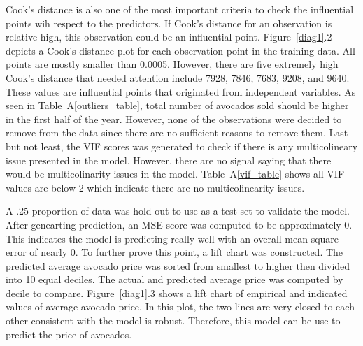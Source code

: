 \documentclass[11pt]{article}\usepackage[]{graphicx}\usepackage[]{color}
\begin{document}
\noindent Cook's distance is also one of the most important criteria to check the influential points wih respect to the predictors. If Cook's distance for an observation is relative high, this observation could be an influential point. Figure~\ref{diag1}.2 depicts a Cook's distance plot for each observation point in the training data. All points are mostly smaller than 0.0005. However, there are five extremely high Cook's distance that needed attention include 7928, 7846, 7683, 9208, and 9640. These values are influential points that originated from independent variables. As seen in Table~A\ref{outliers_table}, total number of avocados sold should be higher in the first half of the year. However, none of the observations were decided to remove from the data since there are no sufficient reasons to remove them. Last but not least, the VIF scores was generated to check if there is any multicolineary issue presented in the model. However, there are no signal saying that there would be multicolinarity issues in the model. Table~A\ref{vif_table} shows all VIF values are below 2 which indicate there are no multicolinearity issues. 

\noindent A .25 proportion of data was hold out to use as a test set to validate the model. After genearting prediction, an MSE score was computed to be approximately 0. This indicates the model is predicting really well with an overall mean square error of nearly 0. To further prove this point, a lift chart was constructed. The predicted average avocado price was sorted from smallest to higher then divided into 10 equal deciles. The actual and predicted average price was computed by decile to compare. Figure~\ref{diag1}.3 shows a lift chart of empirical and indicated values of average avocado price. In this plot, the two lines are very closed to each other consistent with the model is robust. Therefore, this model can be use to predict the price of avocados.   
\hfill \break
\end{document}
